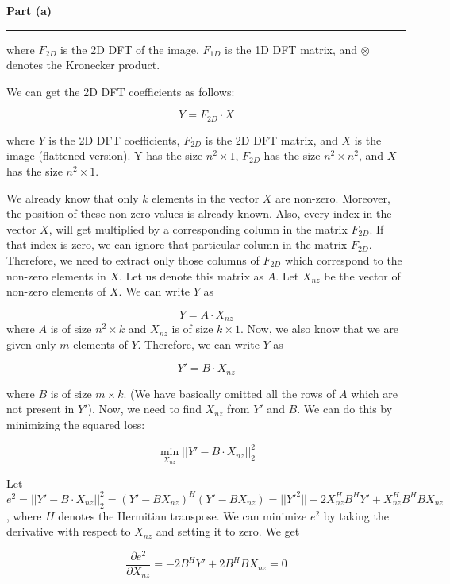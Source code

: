 \documentclass[a4paper,14pt]{article}
\newenvironment{solution}[2][]{%
    \begin{mdframed}[linecolor=blue!70!black, linewidth=2pt, roundcorner=10pt, backgroundcolor=yellow!10!white, skipabove=12pt, skipbelow=12pt]%
        \textbf{\large #2}
        \par\noindent\rule{\textwidth}{0.4pt}
}{
    \end{mdframed}
}
\begin{document}
\begin{solution}{Part (a)}
where $F_{2D}$ is the 2D DFT of the image, $F_{1D}$ is the 1D DFT matrix, and $\otimes$ denotes the Kronecker product.

We can get the 2D DFT coefficients as follows:

\begin{equation}
    Y = F_{2D} \cdot X
\end{equation}

where $Y$ is the 2D DFT coefficients, $F_{2D}$ is the 2D DFT matrix, and $X$ is the image (flattened version). Y has the size $n^2 \times 1$, $F_{2D}$ has the size $n^2 \times n^2$, and $X$ has the size $n^2 \times 1$.

We already know that only $k$ elements in the vector $X$ are non-zero. Moreover, the position of these non-zero values is already known. Also, every index in the vector $X$, will get multiplied by a corresponding column in the matrix $F_{2D}$. If that index is zero, we can ignore that particular column in the matrix $F_{2D}$. Therefore, we need to extract only those columns of $F_{2D}$ which correspond to the non-zero elements in $X$. Let us denote this matrix as $A$. Let $X_{nz}$ be the vector of non-zero elements of $X$. We can write $Y$ as

\begin{equation}
    Y = A \cdot X_{nz}
\end{equation}
where $A$ is of size $n^2 \times k$ and $X_{nz}$ is of size $k \times 1$. Now, we also know that we are given only $m$ elements of $Y$. Therefore, we can write $Y$ as

\begin{equation}
    Y' = B \cdot X_{nz}
\end{equation}

where $B$ is of size $m \times k$. (We have basically omitted all the rows of $A$ which are not present in $Y'$). Now, we need to find $X_{nz}$ from $Y'$ and $B$. We can do this by minimizing the squared loss:

\begin{equation}
    \min_{X_{nz}} ||Y' - B \cdot X_{nz}||_2^2
\end{equation}

Let $e^2 = ||Y' - B \cdot X_{nz}||_2^2 = (Y' - BX_{nz})^H(Y' - BX_{nz}) = ||Y'^2|| - 2X_{nz}^HB^{H}Y' + X_{nz}^HB^{H}BX_{nz}$, where $H$ denotes the Hermitian transpose. We can minimize $e^2$ by taking the derivative with respect to $X_{nz}$ and setting it to zero. We get

\begin{equation}
    \frac{\partial e^2}{\partial X_{nz}} = -2B^HY' + 2B^HBX_{nz} = 0
\end{equation}


\end{solution}
\end{document}
